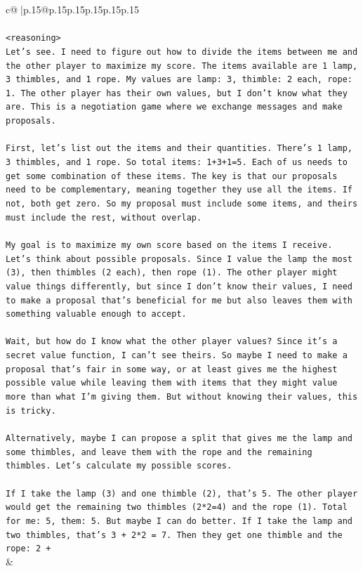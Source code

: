\documentclass{article}
\begin{document}
{\begin{supertabular}{c@{$\;$}|p{.15\linewidth}@{}p{.15\linewidth}p{.15\linewidth}p{.15\linewidth}p{.15\linewidth}p{.15\linewidth}}
{{{\\ 
\\ 
\texttt{<reasoning>} \\
\texttt{Let's see. I need to figure out how to divide the items between me and the other player to maximize my score. The items available are 1 lamp, 3 thimbles, and 1 rope. My values are lamp: 3, thimble: 2 each, rope: 1. The other player has their own values, but I don't know what they are. This is a negotiation game where we exchange messages and make proposals.} \\
\\ 
\texttt{First, let's list out the items and their quantities. There's 1 lamp, 3 thimbles, and 1 rope. So total items: 1+3+1=5. Each of us needs to get some combination of these items. The key is that our proposals need to be complementary, meaning together they use all the items. If not, both get zero. So my proposal must include some items, and theirs must include the rest, without overlap.} \\
\\ 
\texttt{My goal is to maximize my own score based on the items I receive. Let's think about possible proposals. Since I value the lamp the most (3), then thimbles (2 each), then rope (1). The other player might value things differently, but since I don't know their values, I need to make a proposal that's beneficial for me but also leaves them with something valuable enough to accept.} \\
\\ 
\texttt{Wait, but how do I know what the other player values? Since it's a secret value function, I can't see theirs. So maybe I need to make a proposal that's fair in some way, or at least gives me the highest possible value while leaving them with items that they might value more than what I'm giving them. But without knowing their values, this is tricky.} \\
\\ 
\texttt{Alternatively, maybe I can propose a split that gives me the lamp and some thimbles, and leave them with the rope and the remaining thimbles. Let's calculate my possible scores.} \\
\\ 
\texttt{If I take the lamp (3) and one thimble (2), that's 5. The other player would get the remaining two thimbles (2*2=4) and the rope (1). Total for me: 5, them: 5. But maybe I can do better. If I take the lamp and two thimbles, that's 3 + 2*2 = 7. Then they get one thimble and the rope: 2 +} \\
            }
        }
    }
    & \\ \\


\end{supertabular}}
\end{document}
